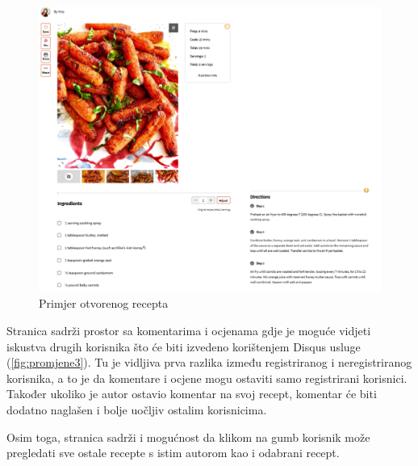 \begin{figure}[H]
	\includegraphics[scale=0.8]{slike/Slika2.PNG} %
	\centering
	\caption{Primjer otvorenog recepta}
	\label{fig:promjene2}
\end{figure}

Stranica sadrži prostor sa komentarima i ocjenama gdje je moguće vidjeti iskustva drugih korisnika što će biti izvedeno korištenjem Disqus usluge (\ref{fig:promjene3}). Tu je vidljiva prva razlika između registriranog i neregistriranog korisnika, a to je da komentare i ocjene mogu ostaviti samo registrirani korisnici. Također ukoliko je autor ostavio komentar na svoj recept, komentar će biti dodatno naglašen i bolje uočljiv ostalim korisnicima.

Osim toga, stranica sadrži i mogućnost da klikom na gumb korisnik može pregledati sve ostale recepte s istim autorom kao i odabrani recept.

